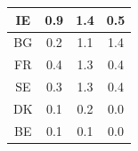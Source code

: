 \begin{table}
\begin{tabular}{cccc}
    \midrule
    IE & \cellcolor{green!13.64}0.9 & \cellcolor{green!21.21}1.4 & \cellcolor{green!7.58}0.5 \\
    \midrule
    BG & \cellcolor{green!3.03}0.2 & \cellcolor{green!16.67}1.1 & \cellcolor{green!21.21}1.4 \\
    \midrule
    FR & \cellcolor{green!6.06}0.4 & \cellcolor{green!19.70}1.3 & \cellcolor{green!6.06}0.4 \\
    \midrule
    SE & \cellcolor{green!4.55}0.3 & \cellcolor{green!19.70}1.3 & \cellcolor{green!6.06}0.4 \\
    \midrule
    DK & \cellcolor{green!1.52}0.1 & \cellcolor{green!3.03}0.2 & \cellcolor{green!0.00}0.0 \\
    \midrule
    BE & \cellcolor{green!1.52}0.1 & \cellcolor{green!1.52}0.1 & \cellcolor{green!0.00}0.0 \\
    \bottomrule
\end{tabular}
\end{table}


